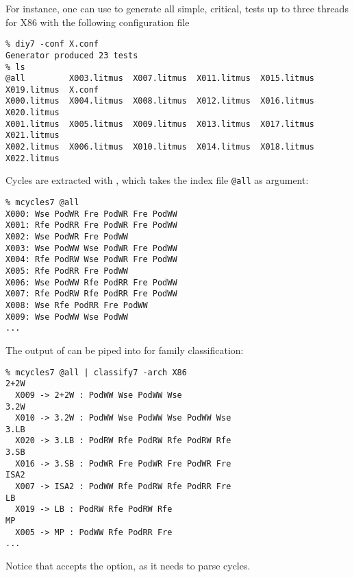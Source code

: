 For instance, one can use \diy{} to generate all simple, critical, tests up
to three threads for X86 with the following configuration file~

\begin{verbatim}
% diy7 -conf X.conf
Generator produced 23 tests
% ls
@all         X003.litmus  X007.litmus  X011.litmus  X015.litmus  X019.litmus  X.conf
X000.litmus  X004.litmus  X008.litmus  X012.litmus  X016.litmus  X020.litmus
X001.litmus  X005.litmus  X009.litmus  X013.litmus  X017.litmus  X021.litmus
X002.litmus  X006.litmus  X010.litmus  X014.litmus  X018.litmus  X022.litmus
\end{verbatim}
Cycles are extracted with \mcycles, which takes the index file \texttt{@all} as argument:
\begin{verbatim}
% mcycles7 @all
X000: Wse PodWR Fre PodWR Fre PodWW
X001: Rfe PodRR Fre PodWR Fre PodWW
X002: Wse PodWR Fre PodWW
X003: Wse PodWW Wse PodWR Fre PodWW
X004: Rfe PodRW Wse PodWR Fre PodWW
X005: Rfe PodRR Fre PodWW
X006: Wse PodWW Rfe PodRR Fre PodWW
X007: Rfe PodRW Rfe PodRR Fre PodWW
X008: Wse Rfe PodRR Fre PodWW
X009: Wse PodWW Wse PodWW
...
\end{verbatim}
The output of \mcycles{} can be piped into \classify{} for family
classification:
\begin{verbatim}
% mcycles7 @all | classify7 -arch X86
2+2W
  X009 -> 2+2W : PodWW Wse PodWW Wse
3.2W
  X010 -> 3.2W : PodWW Wse PodWW Wse PodWW Wse
3.LB
  X020 -> 3.LB : PodRW Rfe PodRW Rfe PodRW Rfe
3.SB
  X016 -> 3.SB : PodWR Fre PodWR Fre PodWR Fre
ISA2
  X007 -> ISA2 : PodWW Rfe PodRW Rfe PodRR Fre
LB
  X019 -> LB : PodRW Rfe PodRW Rfe
MP
  X005 -> MP : PodWW Rfe PodRR Fre
...
\end{verbatim}
Notice that \classify{} accepts the  option, as it needs
to parse cycles.

